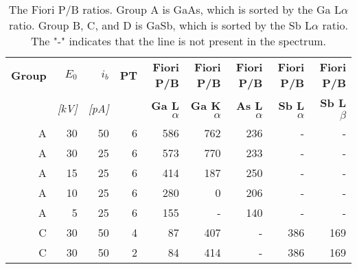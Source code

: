 \begin{table}[hbtp]
    \begin{center}
        \caption{
            The Fiori P/B ratios.
            Group A is GaAs, which is sorted by the Ga L$\alpha$ ratio.
            Group B, C, and D is GaSb, which is sorted by the Sb L$\alpha$ ratio.
            The "-" indicates that the line is not present in the spectrum.
        }
        \label{tab:results:fiori}
        \begin{tabular}{rrrrrrrrr}
            \hline
            \textbf{Group} & \textbf{$E_0$} & \textbf{$i_b$} & \textbf{PT} & \textbf{Fiori P/B}    & \textbf{Fiori P/B}    & \textbf{Fiori P/B}    & \textbf{Fiori P/B}    & \textbf{Fiori P/B}   \\
            \emph{}        & \emph{[kV]}    & \emph{[pA]}    & \emph{}     & \textbf{Ga L$\alpha$} & \textbf{Ga K$\alpha$} & \textbf{As L$\alpha$} & \textbf{Sb L$\alpha$} & \textbf{Sb L$\beta$} \\
            \hline
            A              & 30             & 50             & 6           & 586                   & 762                   & 236                   & -                     & -                    \\
            A              & 30             & 25             & 6           & 573                   & 770                   & 233                   & -                     & -                    \\
            A              & 15             & 25             & 6           & 414                   & 187                   & 250                   & -                     & -                    \\
            A              & 10             & 25             & 6           & 280                   & 0                     & 206                   & -                     & -                    \\
            A              & 5              & 25             & 6           & 155                   & -                     & 140                   & -                     & -                    \\
            \hline
            C              & 30             & 50             & 4           & 87                    & 407                   & -                     & 386                   & 169                  \\
            C              & 30             & 50             & 2           & 84                    & 414                   & -                     & 386                   & 169                  \\

\end{tabular}
\end{center}
\end{table}
